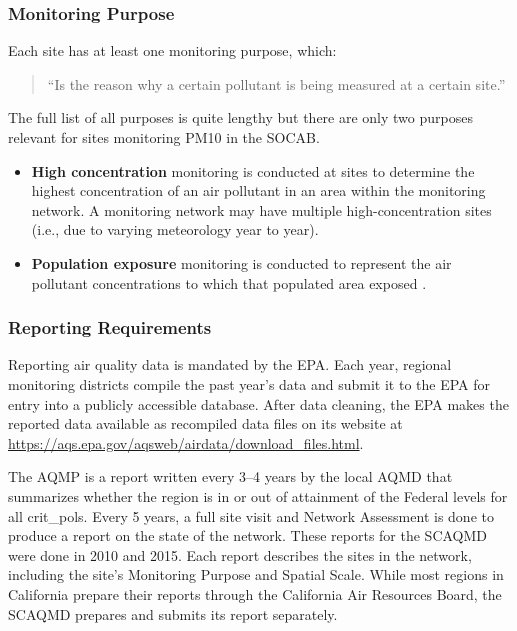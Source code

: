 \subsubsection*{Monitoring Purpose}
\label{subsubsec:purpose}
Each site has at least one monitoring purpose, which: 
\begin{quote}
	``Is the reason why a certain pollutant is being measured at a certain site.'' \citep{AQMNP:2019} 
\end{quote} The full list of all purposes 
is quite lengthy
but there are only two purposes relevant for sites monitoring \ac{PM10} in the \ac{SOCAB}.  
\begin{itemize}
	\item \textbf{High concentration} monitoring is conducted at sites to determine the highest concentration of an air pollutant in an area within the monitoring network. A monitoring network may have multiple high-concentration sites (i.e., due to varying meteorology year to year).
	\item \textbf{Population exposure} monitoring is conducted to represent the air pollutant concentrations to which that populated area exposed 
	\citep{AQMNP:2019}.
\end{itemize}


\subsubsection{Reporting Requirements}
\label{subsubsec:ReportingRequirements}
Reporting air quality data is mandated by the \ac{EPA}.  Each year, regional monitoring districts compile the past year's data and submit it to the \ac{EPA} for entry into a publicly accessible database.  After data cleaning, the \ac{EPA} makes the reported data available as recompiled data files on its website at \url{https://aqs.epa.gov/aqsweb/airdata/download_files.html}.  

The \ac{AQMP} is a report written every 3–4 years by the local \ac{AQMD} that summarizes whether the region is in or out of attainment of the Federal levels for all \glspl{crit_pol}.
Every 5 years, a full site visit and Network Assessment is done to produce a report on the state of the network. These reports for the \ac{SCAQMD} were done in 2010 and 2015.  Each report describes the sites in the network, including the site's Monitoring Purpose and Spatial Scale.  While most regions in California prepare their reports through the California Air Resources Board, the \ac{SCAQMD} prepares and submits its report separately.



